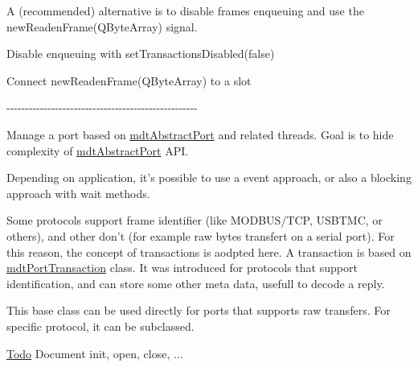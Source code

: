 A (recommended) alternative is to disable frames enqueuing and use the newReadenFrame(QByteArray) signal.
\begin{DoxyItemize}
\item Disable enqueuing with setTransactionsDisabled(false)
\item Connect newReadenFrame(QByteArray) to a slot
\end{DoxyItemize}

-\/-\/-\/-\/-\/-\/-\/-\/-\/-\/-\/-\/-\/-\/-\/-\/-\/-\/-\/-\/-\/-\/-\/-\/-\/-\/-\/-\/-\/-\/-\/-\/-\/-\/-\/-\/-\/-\/-\/-\/-\/-\/-\/-\/-\/-\/-\/-\/-\/-\/-\/

Manage a port based on \hyperlink{classmdt_abstract_port}{mdtAbstractPort} and related threads. Goal is to hide complexity of \hyperlink{classmdt_abstract_port}{mdtAbstractPort} API.

Depending on application, it's possible to use a event approach, or also a blocking approach with wait methods.

Some protocols support frame identifier (like MODBUS/TCP, USBTMC, or others), and other don't (for example raw bytes transfert on a serial port). For this reason, the concept of transactions is aodpted here. A transaction is based on \hyperlink{classmdt_port_transaction}{mdtPortTransaction} class. It was introduced for protocols that support identification, and can store some other meta data, usefull to decode a reply.

This base class can be used directly for ports that supports raw transfers. For specific protocol, it can be subclassed.

\begin{Desc}
\item[\hyperlink{todo__todo000023}{Todo}]Document init, open, close, ...\end{Desc}


